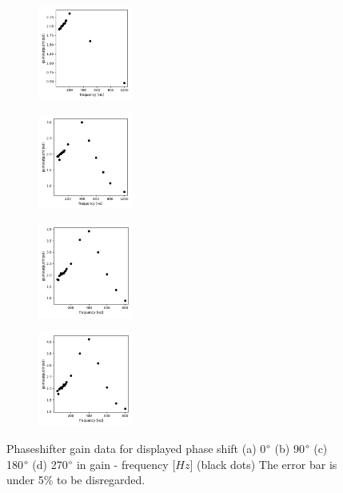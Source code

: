 \documentclass{article}
\begin{document}
\begin{figure}[ht]
  \begin{subfigure}[b]{3.1cm}
      \centering
      \includegraphics[width=3.1cm]{../results/phaseshifter_gain_freq_plot(phase0).png}
      \caption{}
  \end{subfigure}
  \hfill
  \begin{subfigure}[b]{3.1cm}
    \centering
    \includegraphics[width=3.1cm]{../results/phaseshifter_gain_freq_plot(phase90).png}
    \caption{}
\end{subfigure}
\hfill
\begin{subfigure}[b]{3.1cm}
  \centering
  \includegraphics[width=3.1cm]{../results/phaseshifter_gain_freq_plot(phase180).png}
  \caption{}
\end{subfigure}
\hfill
\begin{subfigure}[b]{3.1cm}
  \centering
  \includegraphics[width=3.1cm]{../results/phaseshifter_gain_freq_plot(phase270).png}
  \caption{}
\end{subfigure}
\hfill
  \caption{Phaseshifter gain data for displayed phase shift (a) 0$\degree$ (b) 90$\degree$ (c) 180$\degree$ (d) 270$\degree$ in gain - frequency [$Hz$] (black dots)
      The error bar is under 5\% to be disregarded.
   }
  \label{fig: phaseshifter_gain_plot}
\end{figure}
\end{document}
